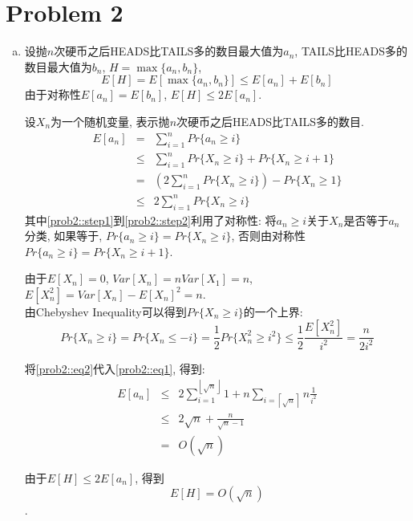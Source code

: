 \documentclass[paper=a4, fontsize=11pt]{scrartcl} %
\numberwithin{equation}{section} %
\numberwithin{figure}{section} %
\numberwithin{table}{section} %
\begin{document}
\section*{Problem 2}
\begin{enumerate}[(a)]
	\item
		设抛$n$次硬币之后HEADS比TAILS多的数目最大值为$a_n$, TAILS比HEADS多的数目最大值为$b_n$, $H = \max\{a_n, b_n\}$, 
		$$E[H] = E[\max\{a_n, b_n\}] \leq E[a_n] + E[b_n]$$
		由于对称性$E[a_n] = E[b_n]$, $E[H] \leq 2E[a_n]$.

		设$X_n$为一个随机变量, 表示抛$n$次硬币之后HEADS比TAILS多的数目.
		\begin{eqnarray}
		E[a_n] &	=& \sum_{i=1}^{n} Pr\{a_n\geq i\} \label{prob2::step1}\\
			   &	\leq& \sum_{i=1}^{n} Pr\{X_n\geq i\} + Pr\{X_n\geq i + 1\} \label{prob2::step2}\\
			   &	=& \left(2\sum_{i=1}^{n} Pr\{X_n\geq i\}\right) - Pr\{X_n\geq 1\} \\ 
			   & \leq& 2\sum_{i=1}^{n} Pr\{X_n\geq i\}
		\label{prob2::eq1}
		\end{eqnarray}
		其中\eqref{prob2::step1}到\eqref{prob2::step2}利用了对称性: 将$a_n\geq i$关于$X_n$是否等于$a_n$分类, 如果等于, $Pr\{a_n\geq i\} = Pr\{X_n\geq i\}$, 否则由对称性$Pr\{a_n\geq i\} = Pr\{X_n \geq i+1\}$.

		由于$E[X_n] = 0$, $Var[X_n] = n Var[X_1] = n$, $E[X_n^2] = Var[X_n] - E[X_n]^2 = n$.\\
		由Chebyshev Inequality可以得到$Pr\{X_n\geq i\}$的一个上界:
		\begin{equation}Pr\{X_n\geq i\} = Pr\{X_n \leq -i\} = \frac{1}{2} Pr\{X_n ^ 2 \geq i^2\} \leq \frac{1}{2}\frac{E[X_n^2]}{i^2} = \frac{n}{2i^2}\label{prob2::eq2}
		\end{equation}

		将\eqref{prob2::eq2}代入\eqref{prob2::eq1}, 得到:
		\begin{eqnarray*}
		E[a_n] &\leq & 2\sum_{i=1}^{\left\lfloor\sqrt{n}\right\rfloor}1 + n\sum_{i=\left\lceil\sqrt{n}\right\rceil}{n}\frac{1}{i^2} \\
			   &\leq & 2\sqrt{n} + \frac{n}{\sqrt{n} - 1} \\
			   &=	 & O\left(\sqrt{n}\right)
		\end{eqnarray*}

		由于$E[H] \leq 2E[a_n]$, 得到\begin{equation}E[H] = O\left(\sqrt{n}\right)\label{prob2::sol1}\end{equation}.


\end{enumerate}
\end{document}
